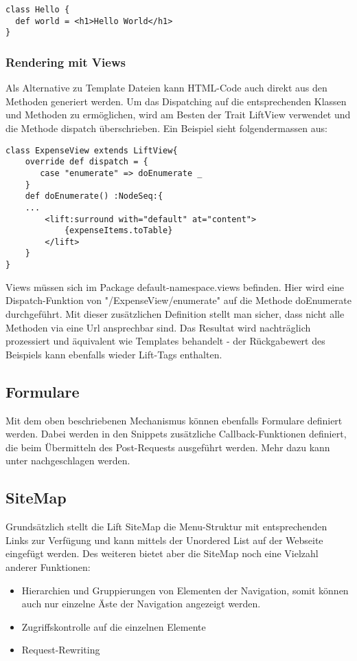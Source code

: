 \begin{lstlisting}[caption=Snippet]
class Hello {
  def world = <h1>Hello World</h1>
}
\end{lstlisting}


\subsubsection{Rendering mit Views}
Als Alternative zu Template Dateien kann HTML-Code auch direkt aus den Methoden generiert werden. Um das Dispatching auf die entsprechenden Klassen und Methoden zu erm\"oglichen, wird am Besten der Trait LiftView verwendet und die Methode dispatch \"uberschrieben. Ein Beispiel sieht folgendermassen aus:

\begin{lstlisting}[caption=Views]
class ExpenseView extends LiftView{
    override def dispatch = { 
       case "enumerate" => doEnumerate _
    }
    def doEnumerate() :NodeSeq:{
 	...
        <lift:surround with="default" at="content">
            {expenseItems.toTable}
        </lift>
    }	
}
\end{lstlisting}
 
Views m\"ussen sich im Package {default-namespace}.views befinden. Hier wird eine Dispatch-Funktion von "/ExpenseView/enumerate" auf die Methode doEnumerate durchgef\"uhrt. Mit dieser zus\"atzlichen Definition stellt man sicher, dass nicht alle Methoden via eine Url ansprechbar sind. Das Resultat wird nachtr\"aglich prozessiert und \"aquivalent wie Templates behandelt - der R\"uckgabewert des Beispiels kann ebenfalls wieder Lift-Tags enthalten.

\subsection{Formulare}
Mit dem oben beschriebenen Mechanismus k\"onnen ebenfalls Formulare definiert werden. Dabei werden in den Snippets zus\"atzliche Callback-Funktionen definiert, die beim \"Ubermitteln des Post-Requests ausgef\"uhrt werden. Mehr dazu kann unter  \cite[p. 47-58]{chen2009lift} nachgeschlagen werden.

\subsection{SiteMap \cite[p. 61-70]{chen2009lift}}\label{lift:sitemap}
Grunds\"atzlich stellt die Lift SiteMap die Menu-Struktur mit entsprechenden Links zur Verf\"ugung und kann mittels der Unordered List auf der Webseite eingef\"ugt werden. Des weiteren bietet aber die SiteMap noch eine Vielzahl anderer Funktionen:
\begin{itemize}
\item Hierarchien und Gruppierungen von Elementen der Navigation, somit k\"onnen auch nur einzelne \"Aste der Navigation angezeigt werden.
\item Zugriffskontrolle auf die einzelnen Elemente
\item Request-Rewriting
\end{itemize}

